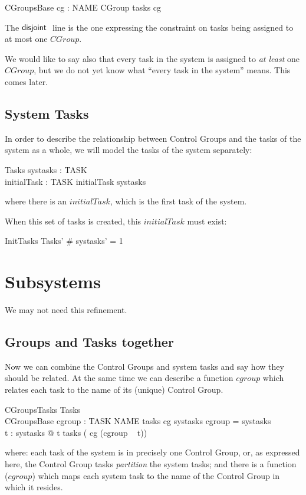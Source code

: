 \documentclass[a4paper,twoside,12pt]{article}
\begin{document}
\begin{schema}{CGroupsBase}
cg : NAME \ffun CGroup
\where
\disjoint tasks \circ cg
\end{schema}
The ${\mathsf{disjoint}}\;$ line is the one expressing the constraint on tasks being assigned to at most one $CGroup$.

We would like to say also that every task in the system is assigned to \emph{at least} one $CGroup$, but we do not yet know what ``every task in the system'' means. This comes later.

\subsection{System Tasks}
In order to describe the relationship between Control Groups and the tasks of the system as a whole, we will model the tasks of the system separately:

\begin{schema}{Tasks}
systasks : \finset TASK \\
initialTask : TASK
\where
initialTask \in systasks
\end{schema}
where there is an $initialTask$, which is the first task of the system.

When this set of tasks is created, this $initialTask$ must exist:

\begin{schema}{InitTasks}
Tasks'
\where
\# systasks' = 1
\end{schema}
\section{Subsystems}
We may not need this refinement.

\subsection{Groups and Tasks together}
Now we can combine the Control Groups and system tasks and say how they should be related. At the same time we can describe a function $cgroup$ which relates each task to the name of its (unique) Control Group.

\begin{schema}{CGroupsTasks}
Tasks \\
CGroupsBase
\also
cgroup : TASK \ffun NAME
\where
tasks \circ cg \partition systasks
\also
\dom cgroup = systasks \\
\forall t : systasks @ t \in tasks ( cg (cgroup ~ t))
\end{schema}
where: each task of the system is in precisely one Control Group, or, as expressed here, the Control Group tasks \emph{partition} the system tasks; and there is a function ($cgroup$) which maps each system task to the name of the Control Group in which it resides.
\end{document}

